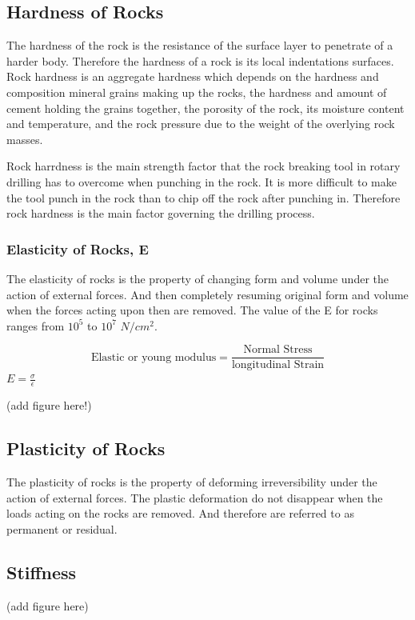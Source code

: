 \documentclass{article}
\begin{document}
\begin{multicols}{2}
  
  \subsection*{Hardness of Rocks}
  The hardness of the rock is the resistance of the surface layer to penetrate of a harder body. Therefore the hardness of a rock is its local indentations surfaces. Rock hardness is an aggregate hardness which depends on the hardness and composition mineral grains making up the rocks, the hardness and amount of cement holding the grains together, the porosity of the rock, its moisture content and temperature, and the rock pressure due to the weight of the overlying rock masses.
  
  
  Rock harrdness is the main strength factor that the rock breaking tool in rotary drilling has to overcome when punching in the rock. It is more difficult to make the tool punch in the rock than to chip off the rock after punching in. Therefore rock hardness is the main factor governing the drilling process.
  
  \subsubsection*{Elasticity of Rocks, E}
  The elasticity of rocks is the property of changing form and volume under the action of external forces. And then completely resuming original form and volume when the forces acting upon then are removed. The value of the E for rocks ranges from $10^5$ to $10^7$ $N/cm^2$. 
  
  
  $$ \text{Elastic or young modulus} = \frac{\text{Normal Stress}}{\text{longitudinal Strain}} $$
  \hspace*{0.5\columnwidth} $E = \frac{\sigma}{\epsilon}$

  (add figure here!)


  \subsection*{Plasticity of Rocks}
  The plasticity of rocks is the property of deforming irreversibility under the action of external forces. The plastic deformation do not disappear when the loads acting on the rocks are removed. And therefore are referred to as permanent or residual.

  \subsection*{Stiffness}
  (add figure here)


\end{multicols}
\end{document}
